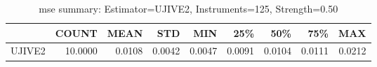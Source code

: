 \begin{table}[ht]
\centering
\caption{mse summary: Estimator=UJIVE2, Instruments=125, Strength=0.50}
\begin{tabular}{lrrrrrrrr}
\toprule
 & COUNT & MEAN & STD & MIN & 25\% & 50\% & 75\% & MAX \\
\midrule
UJIVE2 & 10.0000 & 0.0108 & 0.0042 & 0.0047 & 0.0091 & 0.0104 & 0.0111 & 0.0212 \\
\bottomrule
\end{tabular}
\end{table}
